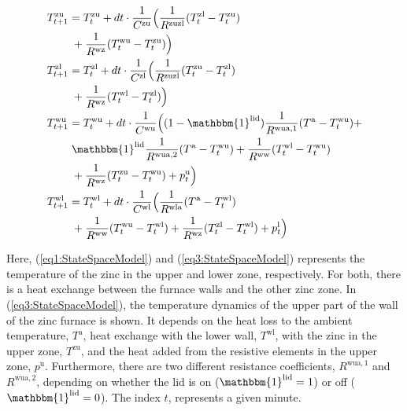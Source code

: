 \documentclass[lettersize,journal]{IEEEtran}
\begin{document}
\begin{subequations}\label{eq:StateSpaceModel}
    \begin{align}
        T^{\text{zu}}_{t+1} & = T^{\text{zu}}_{t} + dt \cdot \frac{1}{C^{\text{zu}}}\Bigl( \frac{1}{R^{\text{zuzl}}} (T^{\text{zl}}_{t} - T^{\text{zu}}_{t}) \notag                            \\ & \mspace{5mu} + \frac{1}{R^{\text{wz}}} (T^{\text{wu}}_{t} - T^{\text{zu}}_{t}) \Bigr) \label{eq1:StateSpaceModel} \\
        T^{\text{zl}}_{t+1} & = T^{\text{zl}}_{t} + dt \cdot \frac{1}{C^{\text{zl}}}\Bigl( \frac{1}{R^{\text{zuzl}}} (T^{\text{zu}}_{t} - T^{\text{zl}}_{t}) \notag                            \\ & \mspace{5mu} + \frac{1}{R^{\text{wz}}} (T^{\text{wl}}_{t} - T^{\text{zl}}_{t}) \Bigr) \label{eq2:StateSpaceModel} \\
        T^{\text{wu}}_{t+1} & = T^{\text{wu}}_{t} + dt \cdot \frac{1}{C^{\text{wu}}}\Bigl( (1-\mathbbm{1}^{\text{lid}}) \frac{1}{R^{\text{wua},1}} (T^{\text{a}} - T^{\text{wu}}_{t}) \notag + \\ & \mspace{5mu} \mathbbm{1}^{\text{lid}} \frac{1}{R^{\text{wua},2}} (T^{\text{a}} - T^{\text{wu}}_{t}) + \frac{1}{R^{\text{ww}}} (T^{\text{wl}}_{t} - T^{\text{wu}}_{t}) \notag \\ & \mspace{5mu} + \frac{1}{R^{\text{wz}}} (T^{\text{zu}}_{t} - T^{\text{wu}}_{t}) + p^{\text{u}}_{t} \Bigr) \label{eq3:StateSpaceModel} \\
        T^{\text{wl}}_{t+1} & = T^{\text{wl}}_{t} + dt \cdot \frac{1}{C^{\text{wl}}}\Bigl( \frac{1}{R^{\text{wla}}} (T^{\text{a}} - T^{\text{wl}}_{t}) \notag                                  \\ & \mspace{5mu} + \frac{1}{R^{\text{ww}}} (T^{\text{wu}}_{t} - T^{\text{wl}}_{t}) + \frac{1}{R^{\text{wz}}} (T^{\text{zl}}_{t} - T^{\text{wl}}_{t}) + p^{\text{l}}_{t} \Bigr) \label{eq4:StateSpaceModel}
    \end{align}
\end{subequations}

Here, (\ref{eq1:StateSpaceModel}) and (\ref{eq3:StateSpaceModel}) represents the temperature of the zinc in the upper and lower zone, respectively. For both, there is a heat exchange between the furnace walls and the other zinc zone. In (\ref{eq3:StateSpaceModel}), the temperature dynamics of the upper part of the wall of the zinc furnace is shown. It depends on the heat loss to the ambient temperature, $T^{\text{a}}$, heat exchange with the lower wall, $T^{\text{wl}}$, with the zinc in the upper zone, $T^{\text{zu}}$, and the heat added from the resistive elements in the upper zone, $p^{\text{u}}$. Furthermore, there are two different resistance coefficients, $R^{\text{wua},1}$ and $R^{\text{wua},2}$, depending on whether the lid is on ($ \mathbbm{1}^{\text{lid}} = 1$) or off ($ \mathbbm{1}^{\text{lid}} = 0$). The index $t$, represents a given minute.
\end{document}
